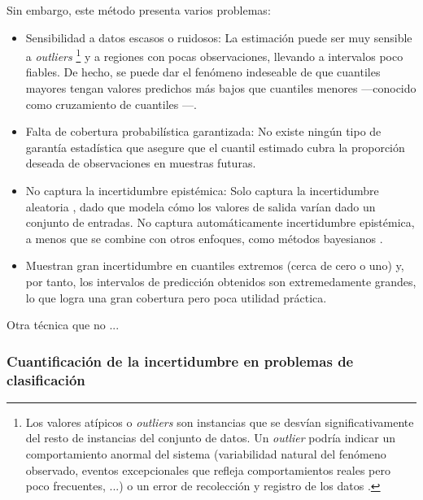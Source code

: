 Sin embargo, este método presenta varios problemas:

\begin{itemize}

    \item Sensibilidad a datos escasos o ruidosos: La estimación puede ser muy sensible a 
    \textit{outliers}
    \footnote{
        Los valores atípicos o \textit{outliers} son instancias que se desvían significativamente del resto
        de instancias del conjunto de datos. Un \textit{outlier} podría indicar un comportamiento anormal
        del sistema (variabilidad natural del fenómeno observado, eventos excepcionales que refleja 
        comportamientos reales pero poco frecuentes, ...) o un error de recolección y registro de los datos 
        \cite{alpaydin2010}.   
    } 
    y a regiones con pocas observaciones, llevando a intervalos poco fiables. De hecho, se puede dar el 
    fenómeno indeseable de que cuantiles mayores tengan valores predichos más bajos que cuantiles menores 
    ---conocido como cruzamiento de cuantiles \cite{koenker2005}---.
    
    \item Falta de cobertura probabilística garantizada: No existe ningún tipo de garantía estadística que 
    asegure que el cuantil estimado cubra la proporción deseada de observaciones en muestras futuras. 
    
    \item No captura la incertidumbre epistémica: Solo captura la incertidumbre aleatoria \cite{abdar2021},
    dado que modela cómo los valores de salida varían dado un conjunto de entradas. No captura automáticamente 
    incertidumbre epistémica, a menos que se combine con otros enfoques, como métodos bayesianos 
    \cite{tokdar2012}.

    \item Muestran gran incertidumbre en cuantiles extremos (cerca de cero o uno) \cite{feldman2023} y, por 
    tanto, los intervalos de predicción obtenidos son extremedamente grandes, lo que logra una gran cobertura
    pero poca utilidad práctica. 
    
\end{itemize}


Otra técnica que no ...





\subsubsection{Cuantificación de la incertidumbre en problemas de clasificación}



